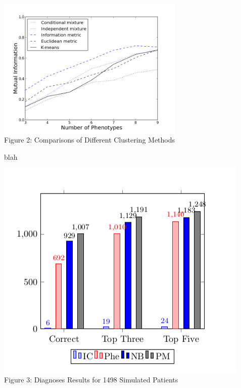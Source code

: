 \documentclass[final]{beamer} %
\begin{document}
\begin{frame}{}
\begin{columns}[T]
\begin{column}{0.3\linewidth}
    \end{column}

    \begin{column}{0.3\linewidth}
    \begin{block}{\Huge }
      \centering
\includegraphics[width=0.7\textwidth]{cluster_comparison.png} \\
   Figure 2: Comparisons of Different Clustering Methods

    \end{block}

    \begin{block}{\large blah}

\centering
\includegraphics[width=.7\textwidth ]{sim_patients}
   \\
   Figure 3: Diagnoses Results for 1498 Simulated Patients
      \end{block}
    \end{column}
    \end{columns}
  \end{frame}
  
\end{document}
